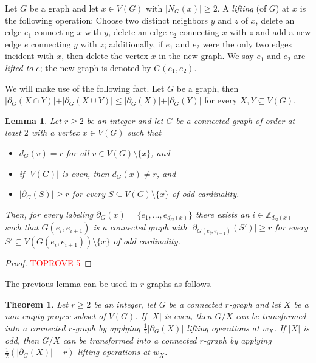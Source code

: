 \documentclass[a4paper,11pt]{article}
\newtheorem{theo}[defi]{Theorem}
\newtheorem{lem}[defi]{Lemma}
\theoremstyle{remark}
\begin{document}
Let $G$ be a graph and let $x \in V(G)$ with $ |N_G(x)|\geq2 $. A \emph{lifting} (of $G$) at $x$ is the following operation: Choose two distinct neighbors $y$ and $z$ of $x$, delete an edge $e_1$ connecting $x$ with $y$, delete an edge $e_2$ connecting $x$ with $z$ and add a new edge $e$ connecting $y$ with $z$; additionally, if $ e_1 $ and $ e_2 $ were the only two edges incident with $ x $, then delete the vertex $ x $ in the new graph. We say $e_1$ and $e_2$ are \emph{lifted to} $e$; the new graph is denoted by $G(e_1,e_2)$. 

We will make use of the following fact. Let $G$ be a graph, then 
$\vert \partial_G(X \cap Y) \vert + \vert \partial_G(X \cup Y) \vert \leq \vert \partial_G(X) \vert + \vert \partial_G(Y) \vert$ for every $X,Y \subseteq V(G)$.



\begin{lem}\label{Lem:r-graph lifting}
	Let $ r \geq 2$ be an integer and let $G$ be a connected graph of order at least $ 2 $ with a vertex $x \in V(G)$ such that
	\begin{itemize}
		\item $d_G(v)=r$ for all $v \in V(G)\setminus\{x\}$, and
		\item if $\vert V(G) \vert$ is even, then $d_G(x)\neq r$, and
		\item $\vert \partial_G(S) \vert \geq r$ for every $S\subseteq V(G)\setminus\{x\}$ of odd cardinality.
	\end{itemize}
	Then, for every labeling $\partial_G(x)=\{e_1,\ldots, e_{d_G(x)}\}$ there exists an  $i \in \mathbb{Z}_{d_G(x)}$ such that $G(e_i,e_{i+1})$ is a connected graph with $\vert \partial_{G(e_i,e_{i+1})}(S') \vert \geq r$ for every $S'\subseteq V(G(e_i,e_{i+1}))\setminus\{x\}$ of odd cardinality.
\end{lem}

\begin{proof}\textcolor{red}{TOPROVE 5}\end{proof}

The previous lemma can be used in $r$-graphs as follows.

\begin{theo}
	\label{theo:r-graph_lifting}
	Let $r\geq 2$ be an integer, let $G$ be a connected $r$-graph and let $X$ be a non-empty proper subset of $V(G)$. If $\vert X \vert$ is even, then $G/X$ can be transformed into a connected $r$-graph by  applying $\frac{1}{2}\left \vert \partial_G(X)\right|$ lifting operations at $w_X$. If $\vert X \vert$ is odd, then $G/X$ can be transformed into a connected $r$-graph by applying $\frac{1}{2}\left( \vert \partial_G(X) \vert - r \right)$ lifting operations at $w_X$.
\end{theo}
\end{document}
